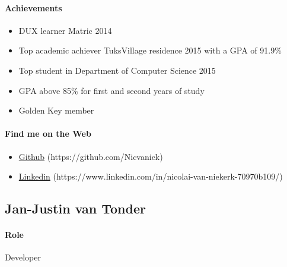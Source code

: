 \documentclass{article}
\begin{document}
        \paragraph{Achievements}
            \begin{itemize}
                \item DUX learner Matric 2014
                \item Top academic achiever TuksVillage residence 2015 with a GPA of 91.9\%
                \item Top student in Department of Computer Science 2015
                \item GPA above 85\% for first and second years of study
                \item Golden Key member
            \end{itemize}
            
        \paragraph{Find me on the Web}
            \begin{itemize}
                \item \href{https://github.com/Nicvaniek}{Github} (https://github.com/Nicvaniek)
                \item \href{https://www.linkedin.com/in/nicolai-van-niekerk-70970b109/}{Linkedin} (https://www.linkedin.com/in/nicolai-van-niekerk-70970b109/)
            \end{itemize}

\newpage
    \subsection{Jan-Justin van Tonder}
        \paragraph{Role} Developer
    
\end{document}
